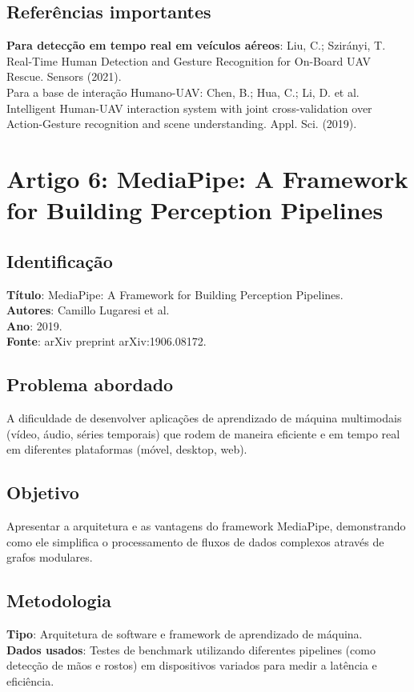 \documentclass[12pt, a4paper]{article}
\begin{document}
\subsection{Referências importantes}
\textbf{Para detecção em tempo real em veículos aéreos}: Liu, C.; Szirányi, T. Real-Time Human Detection and Gesture Recognition for On-Board UAV Rescue. Sensors (2021).\\
Para a base de interação Humano-UAV: Chen, B.; Hua, C.; Li, D. et al. Intelligent Human-UAV interaction system with joint cross-validation over Action-Gesture recognition and scene understanding. Appl. Sci. (2019).\\
\newpage
\section{Artigo 6: MediaPipe: A Framework for Building Perception Pipelines}
\subsection{Identificação}
\textbf{Título}: MediaPipe: A Framework for Building Perception Pipelines.\\
\textbf{Autores}: Camillo Lugaresi et al.\\
\textbf{Ano}: 2019.\\
\textbf{Fonte}: arXiv preprint arXiv:1906.08172.\\
\subsection{Problema abordado}
A dificuldade de desenvolver aplicações de aprendizado de máquina multimodais (vídeo, áudio, séries temporais) que rodem de maneira eficiente e em tempo real em diferentes plataformas (móvel, desktop, web).\\
\subsection{Objetivo}
Apresentar a arquitetura e as vantagens do framework MediaPipe, demonstrando como ele simplifica o processamento de fluxos de dados complexos através de grafos modulares.\\
\subsection{Metodologia}
\textbf{Tipo}: Arquitetura de software e framework de aprendizado de máquina.\\
\textbf{Dados usados}: Testes de benchmark utilizando diferentes pipelines (como detecção de mãos e rostos) em dispositivos variados para medir a latência e eficiência.\\
\end{document}
